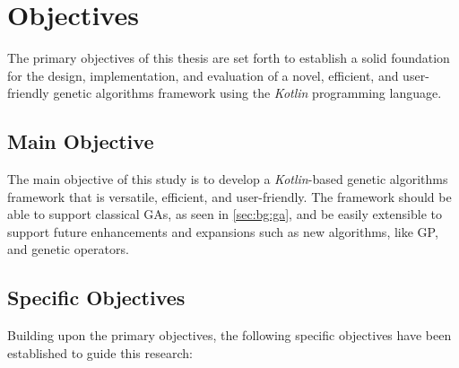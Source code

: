 \section{Objectives}
\label{sec:objectives}
  The primary objectives of this thesis are set forth to establish a solid 
  foundation for the design, implementation, and evaluation of a novel, 
  efficient, and user-friendly genetic algorithms framework using the 
  \textit{Kotlin} programming language.

  \subsection{Main Objective}
    The main objective of this study is to develop a \textit{Kotlin}-based 
    genetic algorithms framework that is versatile, efficient, and
    user-friendly.
    The framework should be able to support classical GAs, as seen in 
    \vref{sec:bg:ga}, and be easily extensible to support future enhancements
    and expansions such as new algorithms, like GP, and genetic operators.

  \subsection{Specific Objectives}
    Building upon the primary objectives, the following specific objectives have
    been established to guide this research:
    
